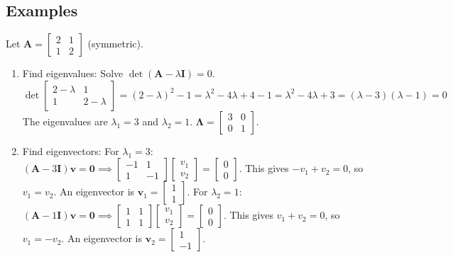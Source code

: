 \documentclass{article}
\newcommand{\vect}[1]{\bm{#1}} %
\newcommand{\mat}[1]{\bm{#1}}  %
\begin{document}
\subsection*{Examples}
Let $\mat{A} = \begin{bmatrix} 2 & 1 \\ 1 & 2 \end{bmatrix}$ (symmetric).
\begin{enumerate}
    \item Find eigenvalues: Solve $\det(\mat{A} - \lambda \mat{I}) = 0$.
    \[ \det \begin{bmatrix} 2-\lambda & 1 \\ 1 & 2-\lambda \end{bmatrix} = (2-\lambda)^2 - 1 = \lambda^2 - 4\lambda + 4 - 1 = \lambda^2 - 4\lambda + 3 = (\lambda - 3)(\lambda - 1) = 0 \]
    The eigenvalues are $\lambda_1 = 3$ and $\lambda_2 = 1$. $\mat{\Lambda} = \begin{bmatrix} 3 & 0 \\ 0 & 1 \end{bmatrix}$.
    \item Find eigenvectors:
    For $\lambda_1 = 3$: $(\mat{A} - 3\mat{I})\vect{v} = \vect{0} \implies \begin{bmatrix} -1 & 1 \\ 1 & -1 \end{bmatrix} \begin{bmatrix} v_1 \\ v_2 \end{bmatrix} = \begin{bmatrix} 0 \\ 0 \end{bmatrix}$. This gives $-v_1 + v_2 = 0$, so $v_1 = v_2$. An eigenvector is $\vect{v}_1 = \begin{bmatrix} 1 \\ 1 \end{bmatrix}$.
    For $\lambda_2 = 1$: $(\mat{A} - 1\mat{I})\vect{v} = \vect{0} \implies \begin{bmatrix} 1 & 1 \\ 1 & 1 \end{bmatrix} \begin{bmatrix} v_1 \\ v_2 \end{bmatrix} = \begin{bmatrix} 0 \\ 0 \end{bmatrix}$. This gives $v_1 + v_2 = 0$, so $v_1 = -v_2$. An eigenvector is $\vect{v}_2 = \begin{bmatrix} 1 \\ -1 \end{bmatrix}$.

\end{enumerate}
\end{document}
